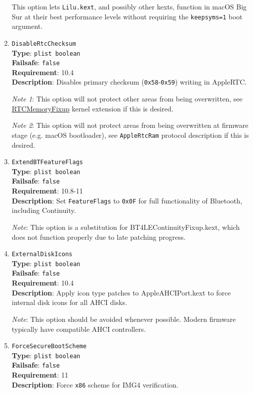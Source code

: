 \documentclass[]{article}
\begin{document}
\begin{enumerate}
  This option lets \texttt{Lilu.kext}, and possibly other kexts, function
  in macOS Big Sur at their best performance levels without requiring the
  \texttt{keepsyms=1} boot argument.

\item
  \texttt{DisableRtcChecksum}\\
  \textbf{Type}: \texttt{plist\ boolean}\\
  \textbf{Failsafe}: \texttt{false}\\
  \textbf{Requirement}: 10.4\\
  \textbf{Description}: Disables primary checksum (\texttt{0x58}-\texttt{0x59})
  writing in AppleRTC.

  \emph{Note 1}: This option will not protect other areas from being overwritten,
  see \href{https://github.com/acidanthera/RTCMemoryFixup}{RTCMemoryFixup}
  kernel extension if this is desired.

  \emph{Note 2}: This option will not protect areas from being overwritten
  at firmware stage (e.g. macOS bootloader), see \texttt{AppleRtcRam} protocol
  description if this is desired.

\item
  \texttt{ExtendBTFeatureFlags}\\
  \textbf{Type}: \texttt{plist\ boolean}\\
  \textbf{Failsafe}: \texttt{false}\\
  \textbf{Requirement}: 10.8-11\\
  \textbf{Description}: Set \texttt{FeatureFlags} to \texttt{0x0F} for full
  functionality of Bluetooth, including Continuity.

  \emph{Note}: This option is a substitution for BT4LEContinuityFixup.kext,
  which does not function properly due to late patching progress.

\item
  \texttt{ExternalDiskIcons}\\
  \textbf{Type}: \texttt{plist\ boolean}\\
  \textbf{Failsafe}: \texttt{false}\\
  \textbf{Requirement}: 10.4\\
  \textbf{Description}: Apply icon type patches to AppleAHCIPort.kext to force
  internal disk icons for all AHCI disks.

  \emph{Note}: This option should be avoided whenever possible. Modern firmware
  typically have compatible AHCI controllers.

\item
  \texttt{ForceSecureBootScheme}\\
  \textbf{Type}: \texttt{plist\ boolean}\\
  \textbf{Failsafe}: \texttt{false}\\
  \textbf{Requirement}: 11\\
  \textbf{Description}: Force \texttt{x86} scheme for IMG4 verification.


\end{enumerate}
\end{document}
